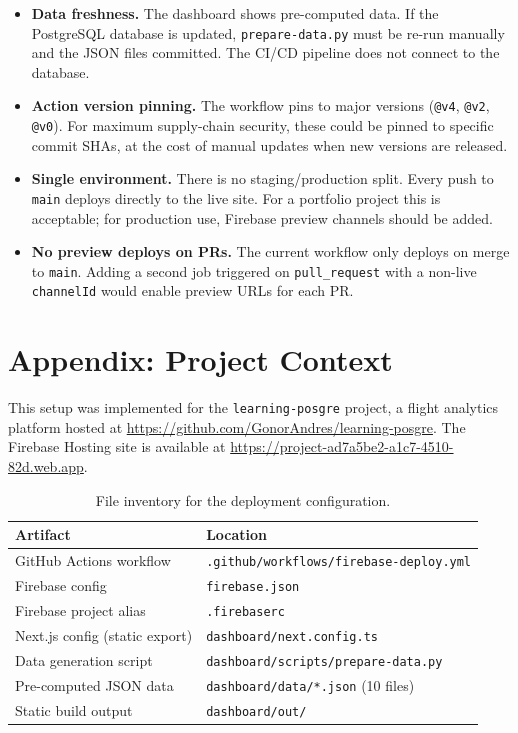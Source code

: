 \documentclass[11pt,a4paper]{article}
\theoremstyle{plainref}
\begin{document}
\begin{itemize}
  \item \textbf{Data freshness.} The dashboard shows pre-computed data. If the
        PostgreSQL database is updated, \texttt{prepare-data.py} must be re-run
        manually and the JSON files committed. The CI/CD pipeline does not
        connect to the database.

  \item \textbf{Action version pinning.} The workflow pins to major versions
        (\texttt{@v4}, \texttt{@v2}, \texttt{@v0}). For maximum supply-chain
        security, these could be pinned to specific commit SHAs, at the cost
        of manual updates when new versions are released.

  \item \textbf{Single environment.} There is no staging/production split.
        Every push to \texttt{main} deploys directly to the live site. For a
        portfolio project this is acceptable; for production use, Firebase
        preview channels should be added.

  \item \textbf{No preview deploys on PRs.} The current workflow only deploys
        on merge to \texttt{main}. Adding a second job triggered on
        \texttt{pull\_request} with a non-live \texttt{channelId} would enable
        preview URLs for each PR.
\end{itemize}

\section*{Appendix: Project Context}

This setup was implemented for the \texttt{learning-posgre} project, a flight
analytics platform hosted at
\url{https://github.com/GonorAndres/learning-posgre}. The Firebase Hosting
site is available at
\url{https://project-ad7a5be2-a1c7-4510-82d.web.app}.

\begin{table}[h]
\centering
\caption{File inventory for the deployment configuration.}
\begin{tabular}{@{}ll@{}}
\toprule
\textbf{Artifact} & \textbf{Location} \\
\midrule
GitHub Actions workflow & \texttt{.github/workflows/firebase-deploy.yml} \\
Firebase config & \texttt{firebase.json} \\
Firebase project alias & \texttt{.firebaserc} \\
Next.js config (static export) & \texttt{dashboard/next.config.ts} \\
Data generation script & \texttt{dashboard/scripts/prepare-data.py} \\
Pre-computed JSON data & \texttt{dashboard/data/*.json} (10 files) \\
Static build output & \texttt{dashboard/out/} \\
\bottomrule
\end{tabular}
\end{table}
\end{document}
